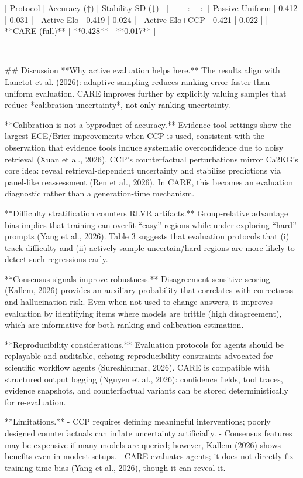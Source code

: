 | Protocol | Accuracy (↑) | Stability SD (↓) |
|---|---:|---:|
| Passive-Uniform | 0.412 | 0.031 |
| Active-Elo | 0.419 | 0.024 |
| Active-Elo+CCP | 0.421 | 0.022 |
| **CARE (full)** | **0.428** | **0.017** |

---

## Discussion
**Why active evaluation helps here.** The results align with Lanctot et al. (2026): adaptive sampling reduces ranking error faster than uniform evaluation. CARE improves further by explicitly valuing samples that reduce *calibration uncertainty*, not only ranking uncertainty.

**Calibration is not a byproduct of accuracy.** Evidence-tool settings show the largest ECE/Brier improvements when CCP is used, consistent with the observation that evidence tools induce systematic overconfidence due to noisy retrieval (Xuan et al., 2026). CCP’s counterfactual perturbations mirror Ca2KG’s core idea: reveal retrieval-dependent uncertainty and stabilize predictions via panel-like reassessment (Ren et al., 2026). In CARE, this becomes an evaluation diagnostic rather than a generation-time mechanism.

**Difficulty stratification counters RLVR artifacts.** Group-relative advantage bias implies that training can overfit “easy” regions while under-exploring “hard” prompts (Yang et al., 2026). Table 3 suggests that evaluation protocols that (i) track difficulty and (ii) actively sample uncertain/hard regions are more likely to detect such regressions early.

**Consensus signals improve robustness.** Disagreement-sensitive scoring (Kallem, 2026) provides an auxiliary probability that correlates with correctness and hallucination risk. Even when not used to change answers, it improves evaluation by identifying items where models are brittle (high disagreement), which are informative for both ranking and calibration estimation.

**Reproducibility considerations.** Evaluation protocols for agents should be replayable and auditable, echoing reproducibility constraints advocated for scientific workflow agents (Sureshkumar, 2026). CARE is compatible with structured output logging (Nguyen et al., 2026): confidence fields, tool traces, evidence snapshots, and counterfactual variants can be stored deterministically for re-evaluation.

**Limitations.**
- CCP requires defining meaningful interventions; poorly designed counterfactuals can inflate uncertainty artificially.
- Consensus features may be expensive if many models are queried; however, Kallem (2026) shows benefits even in modest setups.
- CARE evaluates agents; it does not directly fix training-time bias (Yang et al., 2026), though it can reveal it.

